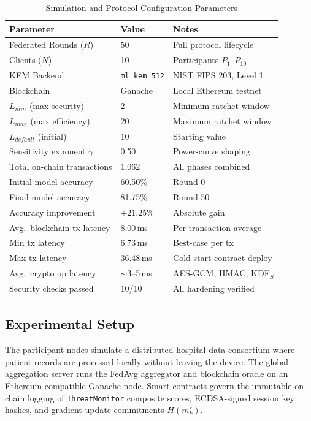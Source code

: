 \documentclass[journal, 10pt, twocolumn]{IEEEtran}
\begin{document}
\begin{table}[H]
\centering
\caption{Simulation and Protocol Configuration Parameters}
\label{tab:sim_params}
\begin{tabular}{l l l}
\toprule
\textbf{Parameter} & \textbf{Value} & \textbf{Notes} \\
\midrule
Federated Rounds ($R$)             & 50              & Full protocol lifecycle \\
Clients ($N$)                      & 10              & Participants $P_1$--$P_{10}$ \\
KEM Backend                        & \texttt{ml\_kem\_512}   & NIST FIPS 203, Level 1 \\
Blockchain                         & Ganache         & Local Ethereum testnet \\
$L_{min}$ (max security)           & 2               & Minimum ratchet window \\
$L_{max}$ (max efficiency)         & 20              & Maximum ratchet window \\
$L_{default}$ (initial)            & 10              & Starting value \\
Sensitivity exponent $\gamma$      & 0.50            & Power-curve shaping \\
Total on-chain transactions        & 1,062           & All phases combined \\
Initial model accuracy             & 60.50\%         & Round 0 \\
Final model accuracy               & 81.75\%         & Round 50 \\
Accuracy improvement               & $+21.25\%$      & Absolute gain \\
Avg.\ blockchain tx latency        & 8.00\,ms        & Per-transaction average \\
Min tx latency                     & 6.73\,ms        & Best-case per tx \\
Max tx latency                     & 36.48\,ms       & Cold-start contract deploy \\
Avg.\ crypto op latency            & $\sim$3--5\,ms  & AES-GCM, HMAC, KDF$_S$ \\
Security checks passed             & 10/10           & All hardening verified \\
\bottomrule
\end{tabular}
\end{table}

\subsection{Experimental Setup}
The participant nodes simulate a distributed hospital data consortium where patient records are processed locally without leaving the device. The global aggregation server runs the FedAvg aggregator and blockchain oracle on an Ethereum-compatible Ganache node. Smart contracts govern the immutable on-chain logging of \texttt{ThreatMonitor} composite scores, ECDSA-signed session key hashes, and gradient update commitments $H(m_k^r)$.
\end{document}

